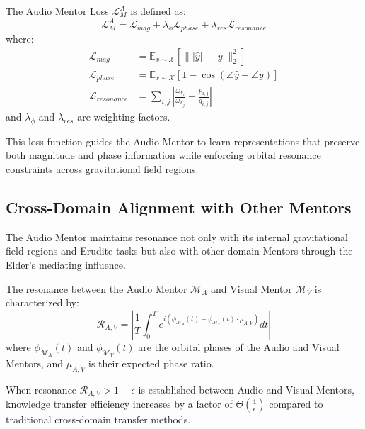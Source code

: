 \begin{definition}
The Audio Mentor Loss $\mathcal{L}_M^A$ is defined as:
\begin{equation}
\mathcal{L}_M^A = \mathcal{L}_{mag} + \lambda_{\phi} \mathcal{L}_{phase} + \lambda_{res} \mathcal{L}_{resonance}
\end{equation}
where:
\begin{align}
\mathcal{L}_{mag} &= \mathbb{E}_{x \sim \mathcal{X}} \left[ \| |\hat{y}| - |y| \|_2^2 \right] \\
\mathcal{L}_{phase} &= \mathbb{E}_{x \sim \mathcal{X}} \left[ 1 - \cos(\angle\hat{y} - \angle y) \right] \\
\mathcal{L}_{resonance} &= \sum_{i,j} \left| \frac{\omega_{F_i}}{\omega_{F_j}} - \frac{p_{i,j}}{q_{i,j}} \right|
\end{align}
and $\lambda_{\phi}$ and $\lambda_{res}$ are weighting factors.
\end{definition}

This loss function guides the Audio Mentor to learn representations that preserve both magnitude and phase information while enforcing orbital resonance constraints across gravitational field regions.

\subsection{Cross-Domain Alignment with Other Mentors}

The Audio Mentor maintains resonance not only with its internal gravitational field regions and Erudite tasks but also with other domain Mentors through the Elder's mediating influence.

\begin{definition}
The resonance between the Audio Mentor $\mathcal{M}_A$ and Visual Mentor $\mathcal{M}_V$ is characterized by:
\begin{equation}
\mathcal{R}_{A,V} = \left| \frac{1}{T} \int_0^T e^{i(\phi_{\mathcal{M}_A}(t) - \phi_{\mathcal{M}_V}(t) \cdot \mu_{A,V})} dt \right|
\end{equation}
where $\phi_{\mathcal{M}_A}(t)$ and $\phi_{\mathcal{M}_V}(t)$ are the orbital phases of the Audio and Visual Mentors, and $\mu_{A,V}$ is their expected phase ratio.
\end{definition}

\begin{theorem}
When resonance $\mathcal{R}_{A,V} > 1-\epsilon$ is established between Audio and Visual Mentors, knowledge transfer efficiency increases by a factor of $\Theta(\frac{1}{\epsilon})$ compared to traditional cross-domain transfer methods.
\end{theorem}

